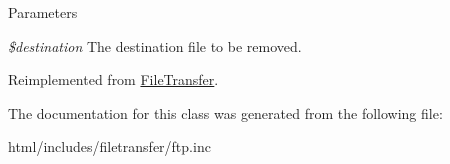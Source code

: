 \begin{DoxyParams}{Parameters}
\item[{\em \$destination}]The destination file to be removed. \end{DoxyParams}


Reimplemented from \hyperlink{classFileTransfer_aa699cbea5def346f1d5ce818b0fa7ea7}{FileTransfer}.

The documentation for this class was generated from the following file:\begin{DoxyCompactItemize}
\item 
html/includes/filetransfer/ftp.inc\end{DoxyCompactItemize}
